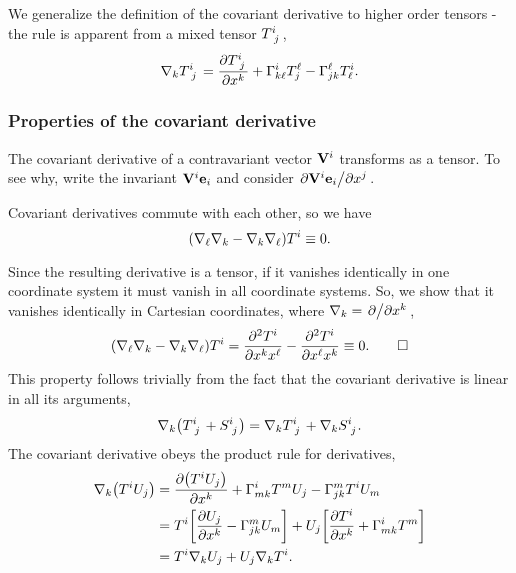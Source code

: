\documentclass{article}
\begin{document}
\begin{definition}
	We generalize the definition of the covariant derivative to higher order tensors - the rule is apparent from a mixed tensor $ T\indices{^{i}_{j}} $,
	\begin{equation}
		\nabla_{k} T\indices{^{i}_{j}}  
		= \pdv{T\indices{^{i}_{j}}}{x^{k}} + \Gamma^{i}_{k\ell} T^{\ell}_{j} - \Gamma^{\ell}_{jk} T^{i}_{\ell}.
	\end{equation}
\end{definition}
\subsubsection{Properties of the covariant derivative}
\begin{proposition}
	The covariant derivative of a contravariant vector $ \vb{V}^{i} $ transforms as a tensor. To see why, write the invariant $ \vb{V}^{i} \vb{e}_{i} $ and consider $ \pdv*{\vb{V}^{i} \vb{e}_{i}}{x^{j}} $.
\end{proposition}
\begin{proposition}[Commutativity]
	Covariant derivatives commute with each other, so we have
	\[
	\qty(\nabla_{\ell} \nabla_{k} - \nabla_{k} \nabla_{\ell}) T^{i} \equiv 0.
	\]
\end{proposition}
\proof Since the resulting derivative is a tensor, if it vanishes identically in one coordinate system it must vanish in all coordinate systems. So, we show that it vanishes identically in Cartesian coordinates, where $ \nabla_k = \pdv*{}{x^{k}} $,
\[
\qty(\nabla_{\ell} \nabla_{k} - \nabla_{k} \nabla_{\ell}) T^{i} = \pdv{^2 T^{i}}{x^{k} x^{\ell}} - \pdv{^2 T^{i}}{x^{\ell} x^{k}} \equiv 0. \qed
\]
\proposition[Distributivity] This property follows trivially from the fact that the covariant derivative is linear in all its arguments,
\[
\nabla_{k} \qty(T\indices{^{i}_{j}} + S\indices{^{i}_{j}}) = \nabla_{k} T\indices{^{i}_{j}} + \nabla_{k} S\indices{^{i}_{j}}.
\] 
 The covariant derivative obeys the product rule for derivatives,
\begin{align*}
\nabla_{k} \qty(T^{i} U_{j}) 
&= \pdv{\qty(T^{i}U_{j})}{x^{k}} + \Gamma^{i}_{mk} T^{m} U_{j} - \Gamma^{m}_{jk} T^{i} U_{m} \\
&= T^{i} \qty[ \pdv{U_{j}}{x^{k}} - \Gamma^{m}_{jk} U_{m} ] + U_{j} \qty[ \pdv{T^{i}}{x^{k}} + \Gamma^{i}_{mk} T^{m} ] \\
&= T^{i} \nabla_{k} U_{j} + U_{j} \nabla_{k} T^{i}.
\end{align*}
\end{document}

